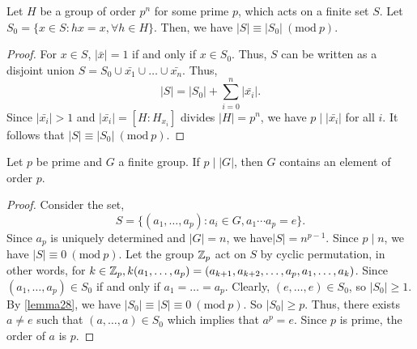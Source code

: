 \documentclass[11pt]{article}
\newcommand{\Mod}[1]{\ (\mathrm{mod}\ #1)}
\begin{document}
\begin{lemma}
Let $H$ be a group of order $p^n$ for some prime $p$, which acts on a finite set
$S$. Let $S_0 = \{ x \in S: hx = x, \forall h \in H\}$. Then, we have $|S|
\equiv |S_0| \Mod{p}$.
\label{lemma28}
\end{lemma}
\begin{proof}
For $x \in S$, $|\bar x| = 1$ if and only if $x \in S_0$. Thus, $S$ can be
written as a disjoint union $S = S_0 \cup \bar{x_1} \cup \dots \cup \bar{x_n}$.
Thus,
\begin{equation*}
|S| = |S_0| + \sum^n_{i=0} |\bar{x_i}|.
\end{equation*}
Since $|\bar{x_i}| > 1$ and $|\bar{x_i}| = [H:H_{x_i}]$ divides $|H| = p^n$, we
have $p \mid |\bar{x_i}|$ for all $i$. It follows that $|S| \equiv |S_0|
\Mod{p}$.
\end{proof}
\begin{theorem}
Let $p$ be prime and $G$ a finite group. If $p \mid |G|$, then $G$ contains an
element of order $p$.
\label{theorem29}
\end{theorem}
\begin{proof}
Consider the set,
\begin{equation*}
S = \{(a_1, \dots, a_p) : a_i \in G, a_1\cdots a_p = e\}.
\end{equation*}
Since $a_p$ is uniquely determined and $|G| = n$, we have$|S| = n^{p-1}$. Since
$p \mid n$, we have $|S| \equiv 0 \Mod{p}$. Let the group $\mathbb{Z}_p$ act on $S$ by
cyclic permutation, in other words, for $k \in \mathbb{Z}_p, k(a_1,\dots,a_p) =
(a_{k+1}, a_{k+2}, \dots, a_p, a_1, \dots, a_k)$. Since $(a_1, \dots, a_p) \in
S_0$ if and only if $a_1 = \dots = a_p$. Clearly, $(e,\dots, e) \in S_0$, so
$|S_0| \geq 1$. By \cref{lemma28}, we have $|S_0| \equiv |S| \equiv 0 \Mod{p}$.
So $|S_0| \geq p$. Thus, there exists $a \neq e$ such that $(a, \dots, a) \in
S_0$ which implies that $a^p = e$. Since $p$ is prime, the order of $a$ is $p$.
\end{proof}
\end{document}
